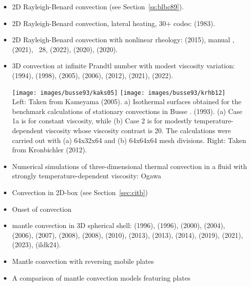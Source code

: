 \begin{itemize}
\item 2D Rayleigh-Benard convection (see Section~\ref{ss:blbc89}).

\item 2D Rayleigh-Benard convection, lateral heating, 30+ codes: 
      \textcite{dejo83} (1983).

\item 2D Rayleigh-Benard convection with nonlinear rheology:  
      \textcite{tosn15} (2015), \aspect{} manual \cite{aspectmanual}, 
      \textcite{trbs21} (2021), \stone~28, \textcite{dakg22} (2022),
      \textcite{siwi20} (2020), \textcite{casd20} (2020).

\item 3D convection at infinite Prandtl number with modest viscosity variation:
      \textcite{bucc94} (1994),
      \textcite{trha98} (1998),
      \textcite{kaks05} (2005),
      \textcite{onmm06} (2006),
      \textcite{krhb12} (2012), 
      \textcite{trbs21} (2021),
      \textcite{dakg22} (2022).

      \begin{center}
      \texttt{[image: images/busse93/kaks05]}
      \texttt{[image: images/busse93/krhb12]}\\
      {\captionfont Left: Taken from Kameyama \etal (2005).
      a) Isothermal surfaces obtained for the benchmark calculations 
      of stationary convections in Busse \etal. (1993). (a) Case 1a is for
      constant viscosity, while (b) Case 2 is for modestly temperature-dependent 
      viscosity whose viscosity contrast is 20. The calculations
      were carried out with (a) 64x32x64 and (b) 64x64x64 mesh divisions.
      Right: Taken from Kronbichler \etal (2012).}
      \end{center}

\item Numerical simulations of three-dimensional thermal convection 
      in a fluid with strongly
      temperature-dependent viscosity: Ogawa \etal \cite{ogsz91,kaks05} 

\item Convection in 2D-box \cite{galb19} (see Section~\ref{sec:citb})
\item Onset of convection \cite{aspectmanual}
\item mantle convection in 3D spherical shell:
      \textcite{rasz96} (1996),
      \textcite{iwas96} (1996),
      \textcite{zhzm00} (2000),
      \textcite{yoka04} (2004),
      \textcite{sthh06} (2006),
      \textcite{chcc07} (2007),
      \textcite{zhmt08} (2008),
      \textcite{kaks08} (2008),
      \textcite{wrfy10} (2010),
      \textcite{dadb13} (2013),
      \textcite{busa13} (2013),
      \textcite{arfw14} (2014),
      \textcite{liki19} (2019),
      \textcite{trbs21} (2021),
      \textcite{eulg23} (2023),
      \textcite{ildk24} (ildk24).

\item Mantle convection with reversing mobile plates \cite{kogk05}
\item A comparison of mantle convection models featuring plates \cite{stlh14}

\end{itemize}

